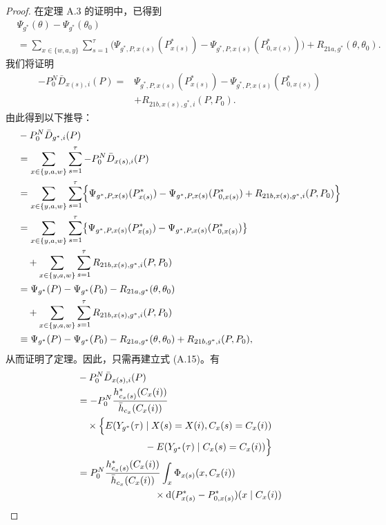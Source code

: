 \begin{proof}
在定理 A.3 的证明中，已得到
\[
\begin{aligned}
&\Psi_{g^*}(\theta)-\Psi_{g^*}(\theta_0)\\
&=\sum_{x\in\{w,a,y\}}\sum_{s=1}^{\tau}
 \bigl(\Psi_{g^*,P,x(s)}(P^*_{x(s)})
 -\Psi_{g^*,P,x(s)}(P^*_{0,x(s)})\bigr)
 +R_{21a,g^*}(\theta,\theta_0).
\end{aligned}
\]
我们将证明
\begin{equation}
\begin{aligned}
-P_0^N\bar D_{x(s),i}(P)
={}&\Psi_{g^*,P,x(s)}(P^*_{x(s)})
 -\Psi_{g^*,P,x(s)}(P^*_{0,x(s)})\\
&+R_{21b,x(s),g^*,i}(P,P_0).
\end{aligned}
\tag{A.15}
\end{equation}
由此得到以下推导：
\[
\begin{aligned}
&-P_0^N\bar D_{g^*,i}(P)\\
&=\sum_{x\in\{y,a,w\}}\sum_{s=1}^{\tau}-P_0^N\bar D_{x(s),i}(P)\\
&=\sum_{x\in\{y,a,w\}}\sum_{s=1}^{\tau}
 \Bigl\{\Psi_{g^*,P,x(s)}(P^*_{x(s)})
 -\Psi_{g^*,P,x(s)}(P^*_{0,x(s)})
 +R_{21b,x(s),g^*,i}(P,P_0)\Bigr\}\\
&=\sum_{x\in\{y,a,w\}}\sum_{s=1}^{\tau}
 \bigl\{\Psi_{g^*,P,x(s)}(P^*_{x(s)})
 -\Psi_{g^*,P,x(s)}(P^*_{0,x(s)})\bigr\}\\
&\quad+\sum_{x\in\{y,a,w\}}\sum_{s=1}^{\tau}R_{21b,x(s),g^*,i}(P,P_0)\\
&=\Psi_{g^*}(P)-\Psi_{g^*}(P_0)-R_{21a,g^*}(\theta,\theta_0)\\
&\quad+\sum_{x\in\{y,a,w\}}\sum_{s=1}^{\tau}R_{21b,x(s),g^*,i}(P,P_0)\\
&\equiv\Psi_{g^*}(P)-\Psi_{g^*}(P_0)-R_{21a,g^*}(\theta,\theta_0)
 +R_{21b,g^*,i}(P,P_0),
\end{aligned}
\]
从而证明了定理。因此，只需再建立式 (A.15)。有
\[
\begin{aligned}
&-P_0^N\bar D_{x(s),i}(P)\\
&=-P_0^N\frac{h^*_{c_x(s)}(C_x(i))}{\bar h_{c_x}(C_x(i))}\\
&\quad\times\Bigl\{E(Y_{g^*}(\tau)\mid X(s)=X(i),C_x(s)=C_x(i))\\
&\hspace{7em}-E(Y_{g^*}(\tau)\mid C_x(s)=C_x(i))\Bigr\}\\
&=P_0^N\frac{h^*_{c_x(s)}(C_x(i))}{\bar h_{c_x}(C_x(i))}
 \int_x\Phi_{x(s)}(x,C_x(i))\\
&\hspace{8em}\times\mathrm d(P^*_{x(s)}-P^*_{0,x(s)})(x\mid C_x(i))\\

\end{aligned}\]
\end{proof}

